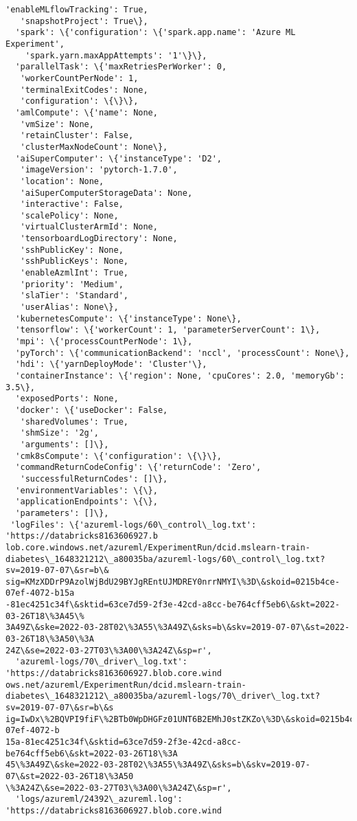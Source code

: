 \documentclass[11pt]{article}
\begin{document}
\begin{tcolorbox}[breakable, size=fbox, boxrule=.5pt, pad at break*=1mm, opacityfill=0]
\begin{Verbatim}[commandchars=\\\{\}]
   'enableMLflowTracking': True,
   'snapshotProject': True\},
  'spark': \{'configuration': \{'spark.app.name': 'Azure ML Experiment',
    'spark.yarn.maxAppAttempts': '1'\}\},
  'parallelTask': \{'maxRetriesPerWorker': 0,
   'workerCountPerNode': 1,
   'terminalExitCodes': None,
   'configuration': \{\}\},
  'amlCompute': \{'name': None,
   'vmSize': None,
   'retainCluster': False,
   'clusterMaxNodeCount': None\},
  'aiSuperComputer': \{'instanceType': 'D2',
   'imageVersion': 'pytorch-1.7.0',
   'location': None,
   'aiSuperComputerStorageData': None,
   'interactive': False,
   'scalePolicy': None,
   'virtualClusterArmId': None,
   'tensorboardLogDirectory': None,
   'sshPublicKey': None,
   'sshPublicKeys': None,
   'enableAzmlInt': True,
   'priority': 'Medium',
   'slaTier': 'Standard',
   'userAlias': None\},
  'kubernetesCompute': \{'instanceType': None\},
  'tensorflow': \{'workerCount': 1, 'parameterServerCount': 1\},
  'mpi': \{'processCountPerNode': 1\},
  'pyTorch': \{'communicationBackend': 'nccl', 'processCount': None\},
  'hdi': \{'yarnDeployMode': 'Cluster'\},
  'containerInstance': \{'region': None, 'cpuCores': 2.0, 'memoryGb': 3.5\},
  'exposedPorts': None,
  'docker': \{'useDocker': False,
   'sharedVolumes': True,
   'shmSize': '2g',
   'arguments': []\},
  'cmk8sCompute': \{'configuration': \{\}\},
  'commandReturnCodeConfig': \{'returnCode': 'Zero',
   'successfulReturnCodes': []\},
  'environmentVariables': \{\},
  'applicationEndpoints': \{\},
  'parameters': []\},
 'logFiles': \{'azureml-logs/60\_control\_log.txt': 'https://databricks8163606927.b
lob.core.windows.net/azureml/ExperimentRun/dcid.mslearn-train-
diabetes\_1648321212\_a80035ba/azureml-logs/60\_control\_log.txt?sv=2019-07-07\&sr=b\&
sig=KMzXDDrP9AzolWjBdU29BYJgREntUJMDREY0nrrNMYI\%3D\&skoid=0215b4ce-07ef-4072-b15a
-81ec4251c34f\&sktid=63ce7d59-2f3e-42cd-a8cc-be764cff5eb6\&skt=2022-03-26T18\%3A45\%
3A49Z\&ske=2022-03-28T02\%3A55\%3A49Z\&sks=b\&skv=2019-07-07\&st=2022-03-26T18\%3A50\%3A
24Z\&se=2022-03-27T03\%3A00\%3A24Z\&sp=r',
  'azureml-logs/70\_driver\_log.txt': 'https://databricks8163606927.blob.core.wind
ows.net/azureml/ExperimentRun/dcid.mslearn-train-
diabetes\_1648321212\_a80035ba/azureml-logs/70\_driver\_log.txt?sv=2019-07-07\&sr=b\&s
ig=IwDx\%2BQVPI9fiF\%2BTb0WpDHGFz01UNT6B2EMhJ0stZKZo\%3D\&skoid=0215b4ce-07ef-4072-b
15a-81ec4251c34f\&sktid=63ce7d59-2f3e-42cd-a8cc-be764cff5eb6\&skt=2022-03-26T18\%3A
45\%3A49Z\&ske=2022-03-28T02\%3A55\%3A49Z\&sks=b\&skv=2019-07-07\&st=2022-03-26T18\%3A50
\%3A24Z\&se=2022-03-27T03\%3A00\%3A24Z\&sp=r',
  'logs/azureml/24392\_azureml.log': 'https://databricks8163606927.blob.core.wind

\end{Verbatim}
\end{tcolorbox}
\end{document}
